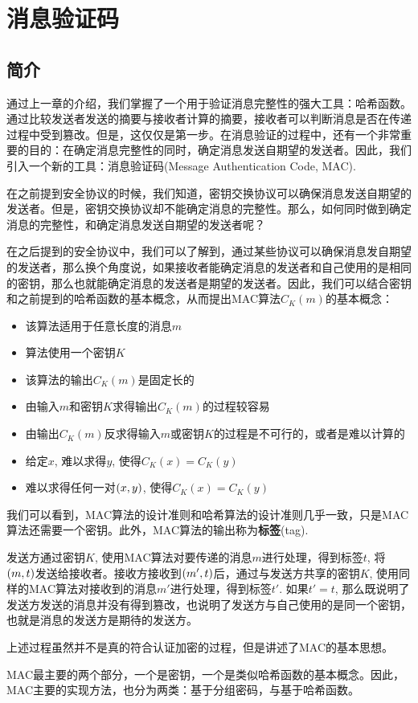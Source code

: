 \chapter{消息验证码}
\section{简介}
通过上一章的介绍，我们掌握了一个用于验证消息完整性的强大工具：哈希函数。通过比较发送者发送的摘要与接收者计算的摘要，接收者可以判断消息是否在传递过程中受到篡改。但是，这仅仅是第一步。在消息验证的过程中，还有一个非常重要的目的：在确定消息完整性的同时，确定消息发送自期望的发送者。因此，我们引入一个新的工具：消息验证码(Message Authentication Code, MAC).\par
在之前提到安全协议的时候，我们知道，密钥交换协议可以确保消息发送自期望的发送者。但是，密钥交换协议却不能确定消息的完整性。那么，如何同时做到确定消息的完整性，和确定消息发送自期望的发送者呢？\par
在之后提到的安全协议中，我们可以了解到，通过某些协议可以确保消息发自期望的发送者，那么换个角度说，如果接收者能确定消息的发送者和自己使用的是相同的密钥，那么也就能确定消息的发送者是期望的发送者。因此，我们可以结合密钥和之前提到的哈希函数的基本概念，从而提出MAC算法$C_K(m)$的基本概念：
\begin{itemize}
	\item 该算法适用于任意长度的消息$m$
	\item 算法使用一个密钥$K$
	\item 该算法的输出$C_K(m)$是固定长的
	\item 由输入$m$和密钥$K$求得输出$C_K(m)$的过程较容易
	\item 由输出$C_K(m)$反求得输入$m$或密钥$K$的过程是不可行的，或者是难以计算的
	\item 给定$x$, 难以求得$y$, 使得$C_K(x)=C_K(y)$
	\item 难以求得任何一对$\left( {x, y}\right)$, 使得$C_K(x)=C_K(y)$
\end{itemize}

我们可以看到，MAC算法的设计准则和哈希算法的设计准则几乎一致，只是MAC算法还需要一个密钥。此外，MAC算法的输出称为\textbf{标签}(tag).\par
发送方通过密钥$K$, 使用MAC算法对要传递的消息$m$进行处理，得到标签$t$, 将$\left( {m, t}\right)$发送给接收者。接收方接收到$\left( {m', t}\right)$后，通过与发送方共享的密钥$K$, 使用同样的MAC算法对接收到的消息$m'$进行处理，得到标签$t'$. 如果$t'=t$, 那么既说明了发送方发送的消息并没有得到篡改，也说明了发送方与自己使用的是同一个密钥，也就是消息的发送方是期待的发送方。\par
上述过程虽然并不是真的符合认证加密的过程，但是讲述了MAC的基本思想。\par
MAC最主要的两个部分，一个是密钥，一个是类似哈希函数的基本概念。因此，MAC主要的实现方法，也分为两类：基于分组密码，与基于哈希函数。
